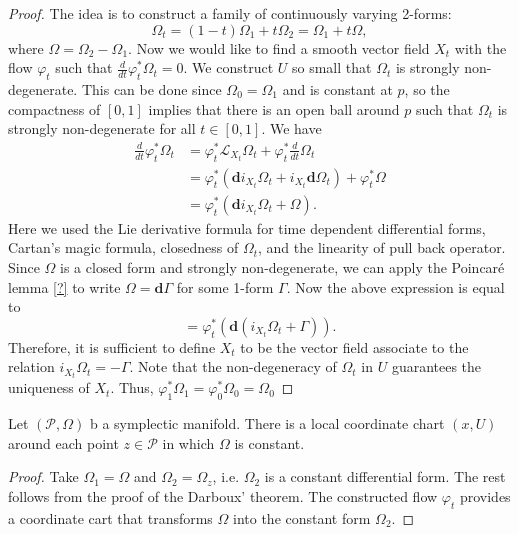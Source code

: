 \begin{proof}
The idea is to construct a family of continuously varying 2-forms:
\begin{equation*}
\Omega_t = (1-t)\Omega_1 + t\Omega_2 = \Omega_1 + t \Omega,
\end{equation*}
where $\Omega = \Omega_2 - \Omega_1$. Now we would like to find a smooth vector field $X_t$ with the flow $\varphi_t$ such that $\frac{d}{dt} \varphi_t^*\Omega_t = 0$. We construct $U$ so small that $\Omega_t$ is strongly non-degenerate. This can be done since $\Omega_0 = \Omega_1$ and is constant at $p$, so the compactness of $[0,1]$ implies that there is an open ball around $p$ such that $\Omega_t$ is strongly non-degenerate for all $t\in [0,1]$. We have
\begin{equation*}
\begin{aligned}
	\frac{d}{dt} \varphi_t^*\Omega_t &= \varphi_t^* \mathcal L_{X_t} \Omega_t + \varphi_t^* \frac{d}{dt} \Omega_t \\
	&= \varphi_t^*( \mathbf d i_{X_t}\Omega_t + i_{X_t} \mathbf d \Omega_t ) + \varphi_t^* \Omega \\
	&= \varphi_t^*( \mathbf d i_{X_t}\Omega_t + \Omega ).
\end{aligned}
\end{equation*}
Here we used the Lie derivative formula for time dependent differential forms, Cartan's magic formula, closedness of $\Omega_t$, and the linearity of pull back operator. Since $\Omega$ is a closed form and strongly non-degenerate, we can apply the Poincar\'e lemma \ref{?} to write $\Omega = \mathbf d \Gamma$ for some 1-form $\Gamma$. Now the above expression is equal to
\begin{equation*}
	= \varphi_t^*( \mathbf d ( i_{X_t}\Omega_t + \Gamma ) ).
\end{equation*}
Therefore, it is sufficient to define $X_t$ to be the vector field associate to the relation $i_{X_t}\Omega_t = - \Gamma$. Note that the non-degeneracy of $\Omega_t$ in $U$ guarantees the uniqueness of $X_t$. Thus, $\varphi_1^* \Omega_1 = \varphi_0^* \Omega_0 = \Omega_0$
\end{proof}

\begin{corollary} \label{theorem:2.6}
Let $(\mathcal P, \Omega)$ b a symplectic manifold. There is a local coordinate chart $(x,U)$ around each point $z\in\mathcal P$ in which $\Omega$ is constant.
\end{corollary}
\begin{proof}
Take $\Omega_1 = \Omega$ and $\Omega_2 = \Omega_z$, i.e. $\Omega_2$ is a constant differential form. The rest follows from the proof of the Darboux' theorem. The constructed flow $\varphi_t$ provides a coordinate cart that transforms $\Omega$ into the constant form $\Omega_2$.
\end{proof}

